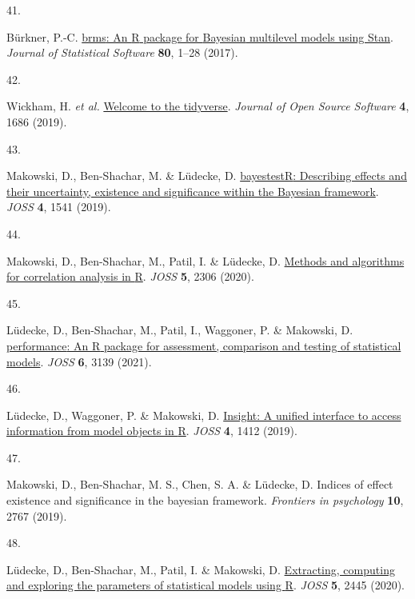 \documentclass[
  man,floatsintext]{apa6}
\newlength{\cslhangindent}
\newlength{\csllabelwidth}
\newlength{\cslentryspacingunit} %
\newenvironment{CSLReferences}[2] %
 {%
  \setlength{\parindent}{0pt}
  \ifodd #1
  \let\oldpar\par
  \def\par{\hangindent=\cslhangindent\oldpar}
  \fi
  \setlength{\parskip}{#2\cslentryspacingunit}
 }%
 {}
\newcommand{\CSLLeftMargin}[1]{\parbox[t]{\csllabelwidth}{#1}}
\newcommand{\CSLRightInline}[1]{\parbox[t]{\linewidth - \csllabelwidth}{#1}\break}
\begin{document}
\begin{CSLReferences}{0}{0}
\leavevmode{}%
\CSLLeftMargin{41. }%
\CSLRightInline{Bürkner, P.-C. \href{https://doi.org/10.18637/jss.v080.i01}{{brms}: An {R} package for {Bayesian} multilevel models using {Stan}}. \emph{Journal of Statistical Software} \textbf{80}, 1--28 (2017).}

\leavevmode{}%
\CSLLeftMargin{42. }%
\CSLRightInline{Wickham, H. \emph{et al.} \href{https://doi.org/10.21105/joss.01686}{Welcome to the tidyverse}. \emph{Journal of Open Source Software} \textbf{4}, 1686 (2019).}

\leavevmode{}%
\CSLLeftMargin{43. }%
\CSLRightInline{Makowski, D., Ben-Shachar, M. \& Lüdecke, D. \href{https://doi.org/10.21105/joss.01541}{{bayestestR}: Describing effects and their uncertainty, existence and significance within the {Bayesian} framework}. \emph{JOSS} \textbf{4}, 1541 (2019).}

\leavevmode{}%
\CSLLeftMargin{44. }%
\CSLRightInline{Makowski, D., Ben-Shachar, M., Patil, I. \& Lüdecke, D. \href{https://doi.org/10.21105/joss.02306}{Methods and algorithms for correlation analysis in {R}}. \emph{JOSS} \textbf{5}, 2306 (2020).}

\leavevmode{}%
\CSLLeftMargin{45. }%
\CSLRightInline{Lüdecke, D., Ben-Shachar, M., Patil, I., Waggoner, P. \& Makowski, D. \href{https://doi.org/10.21105/joss.03139}{{performance}: An {R} package for assessment, comparison and testing of statistical models}. \emph{JOSS} \textbf{6}, 3139 (2021).}

\leavevmode{}%
\CSLLeftMargin{46. }%
\CSLRightInline{Lüdecke, D., Waggoner, P. \& Makowski, D. \href{https://doi.org/10.21105/joss.01412}{Insight: A unified interface to access information from model objects in {R}}. \emph{JOSS} \textbf{4}, 1412 (2019).}

\leavevmode{}%
\CSLLeftMargin{47. }%
\CSLRightInline{Makowski, D., Ben-Shachar, M. S., Chen, S. A. \& Lüdecke, D. Indices of effect existence and significance in the bayesian framework. \emph{Frontiers in psychology} \textbf{10}, 2767 (2019).}

\leavevmode{}%
\CSLLeftMargin{48. }%
\CSLRightInline{Lüdecke, D., Ben-Shachar, M., Patil, I. \& Makowski, D. \href{https://doi.org/10.21105/joss.02445}{Extracting, computing and exploring the parameters of statistical models using {R}}. \emph{JOSS} \textbf{5}, 2445 (2020).}


\end{CSLReferences}
\end{document}
